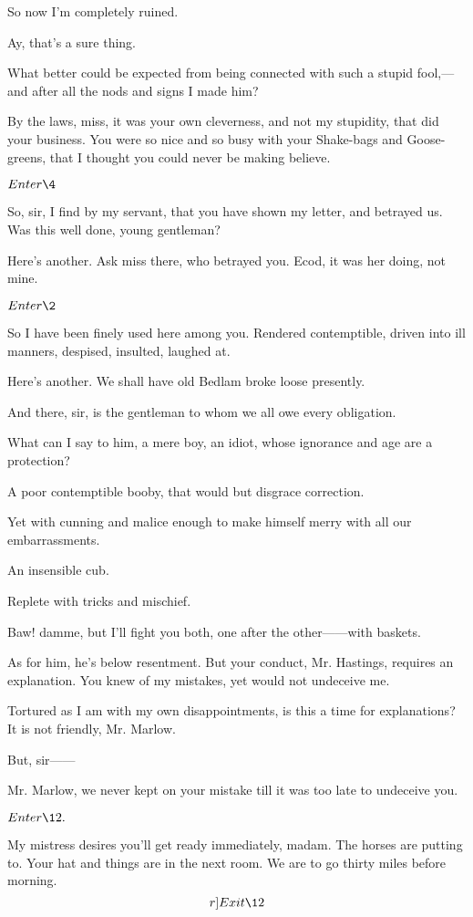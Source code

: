 \documentclass{book}
\begin{document}
\9  So now I'm completely ruined.

\5  Ay, that's a sure thing.

\9  What better could be expected from being connected with
such a stupid fool,---and after all the nods and signs I made him?

\5  By the laws, miss, it was your own cleverness, and not my
stupidity, that did your business.  You were so nice and so busy with
your Shake-bags and Goose-greens, that I thought you could never be
making believe.


\(Enter \4\)


\4  So, sir, I find by my servant, that you have shown my
letter, and betrayed us.  Was this well done, young gentleman?

\5  Here's another.  Ask miss there, who betrayed you.  Ecod, it was
her doing, not mine.


\(Enter \2\)


\2  So I have been finely used here among you.  Rendered
contemptible, driven into ill manners, despised, insulted, laughed at.

\5  Here's another.  We shall have old Bedlam broke loose
presently.

\9  And there, sir, is the gentleman to whom we all owe
every obligation.

\2  What can I say to him, a mere boy, an idiot, whose ignorance
and age are a protection?

\4  A poor contemptible booby, that would but disgrace
correction.

\9  Yet with cunning and malice enough to make himself
merry with all our embarrassments.

\4  An insensible cub.

\2  Replete with tricks and mischief.

\5  Baw! damme, but I'll fight you both, one after the
other------with baskets.

\2  As for him, he's below resentment.  But your conduct, Mr.
Hastings, requires an explanation.  You knew of my mistakes, yet would
not undeceive me.

\4  Tortured as I am with my own disappointments, is this a time
for explanations?  It is not friendly, Mr. Marlow.

\2  But, sir------

\9  Mr. Marlow, we never kept on your mistake till it was
too late to undeceive you.


\(Enter \12.\)


  My mistress desires you'll get ready immediately, madam.  The
horses are putting to.  Your hat and things are in the next room.  We
are to go thirty miles before morning.  \[r]Exit \12\]
\end{document}
